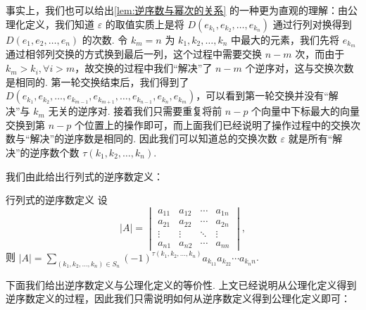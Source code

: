 事实上，我们也可以给出\autoref{lem:逆序数与幂次的关系} 的一种更为直观的理解：由公理化定义，我们知道 $\varepsilon$ 的取值实质上是将 $D(e_{k_1}, e_{k_2}, \ldots, e_{k_n})$ 通过行列对换得到 $D(e_1, e_2, \ldots, e_n)$ 的次数. 令 $k_m = n$ 为 $k_1, k_2, \ldots, k_n$ 中最大的元素，我们先将 $e_{k_m}$ 通过相邻列交换的方式换到最后一列，这个过程中需要交换 $n - m$ 次，而由于 $k_m > k_i, \forall i > m$，故交换的过程中我们``解决''了 $n - m$ 个逆序对，这与交换次数是相同的. 第一轮交换结束后，我们得到了 $D(e_{k_1}, e_{k_2}, \ldots, e_{k_{m-1}}, e_{k_{m+1}}, \ldots, e_{k_{n-1}}, e_{k_{n}}, e_{{k_m}})$，可以看到第一轮交换并没有``解决''与 $k_m$ 无关的逆序对. 接着我们只需要重复将前 $n-p$ 个向量中下标最大的向量交换到第 $n-p$ 个位置上的操作即可，而上面我们已经说明了操作过程中的交换次数与``解决''的逆序数是相同的. 因此我们可以知道总的交换次数 $\varepsilon$ 就是所有``解决''的逆序数个数 $\tau(k_1,k_2,\ldots,k_n)$.

我们由此给出行列式的逆序数定义：

\begin{theorem}{行列式的逆序数定义}{}
    设
    \[|A| = \begin{vmatrix}
            a_{11} & a_{12} & \cdots & a_{1n} \\
            a_{21} & a_{22} & \cdots & a_{2n} \\
            \vdots & \vdots & \ddots & \vdots \\
            a_{n1} & a_{n2} & \cdots & a_{nn}
        \end{vmatrix},\]
    则 $|A| = \sum\limits_{(k_1,k_2,\ldots,k_n) \in S_n} (-1)^{\tau(k_1,k_2,\ldots,k_n)}a_{k_11}a_{k_22}\cdots a_{k_nn}$.
\end{theorem}

下面我们给出逆序数定义与公理化定义的等价性. 上文已经说明从公理化定义得到逆序数定义的过程，因此我们只需说明如何从逆序数定义得到公理化定义即可：

